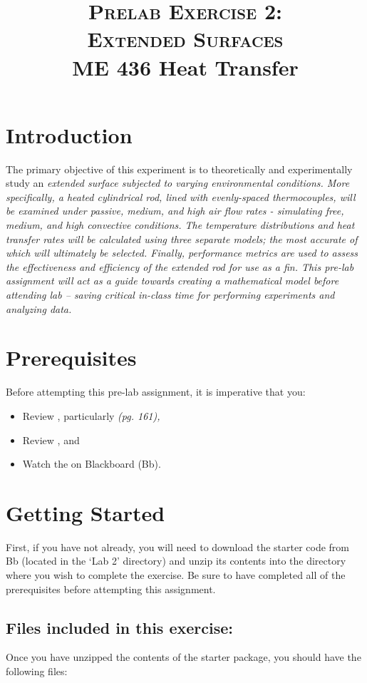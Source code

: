 \documentclass[11pt, letterpaper]{article}
\title{ \textsc{Prelab Exercise 2: \\ Extended Surfaces} \\ {\large  \color{darkgray} ME 436 Heat Transfer}}
\begin{document}
\date{}
\maketitle
\thispagestyle{firstpage} 

\section*{Introduction}

The primary objective of this experiment is to theoretically and experimentally study an \it{extended surface} subjected to varying environmental conditions. More specifically, a heated cylindrical rod, lined with evenly-spaced thermocouples,  will be examined under passive, medium, and high air flow rates - simulating free, medium, and high convective conditions. The temperature distributions and heat transfer rates will be calculated using three separate models; the most accurate of which will ultimately be selected. Finally, performance metrics are used to assess the effectiveness and efficiency of the extended rod for use as a fin.
\n
This pre-lab assignment will act as a guide towards creating a mathematical model before attending lab --  saving critical in-class time for performing experiments and analyzing data. 

\section*{Prerequisites}
Before attempting this pre-lab assignment, it is imperative that you:
{\small
\begin{itemize}
    \item Review , particularly  \it{(pg. 161)},
    \item Review , and
    \item Watch the  on Blackboard (Bb).
\end{itemize}
}

\section*{Getting Started}
First, if you have not already, you will need to download the starter code from Bb (located in the `Lab 2' directory) and unzip its contents into the directory where you wish to complete the exercise. Be sure to have completed all of the prerequisites before attempting this assignment.

\subsection*{Files included in this exercise:}
Once you have unzipped the contents of the starter package, you should have the following files:
\end{document}

